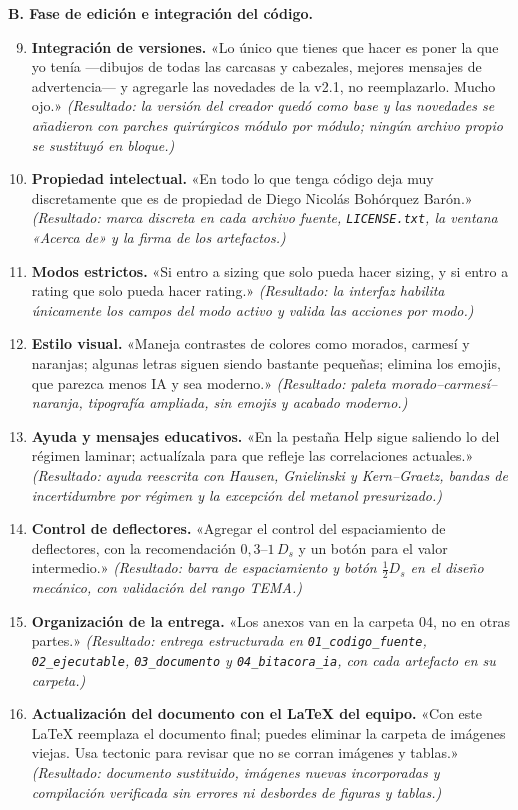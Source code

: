 \documentclass[11pt,a4paper]{article}
\begin{document}
\textbf{B. Fase de edición e integración del código.}
\begin{enumerate}\setcounter{enumi}{8}
\item \textbf{Integración de versiones.} «Lo único que tienes que hacer es
poner la que yo tenía ---dibujos de todas las carcasas y cabezales, mejores
mensajes de advertencia--- y agregarle las novedades de la v2.1, no
reemplazarlo. Mucho ojo.» \emph{(Resultado: la versión del creador quedó
como base y las novedades se añadieron con parches quirúrgicos módulo por
módulo; ningún archivo propio se sustituyó en bloque.)}
\item \textbf{Propiedad intelectual.} «En todo lo que tenga código deja
muy discretamente que es de propiedad de Diego Nicolás Bohórquez Barón.»
\emph{(Resultado: marca discreta en cada archivo fuente,
\texttt{LICENSE.txt}, la ventana «Acerca de» y la firma de los
artefactos.)}
\item \textbf{Modos estrictos.} «Si entro a sizing que solo pueda hacer
sizing, y si entro a rating que solo pueda hacer rating.»
\emph{(Resultado: la interfaz habilita únicamente los campos del modo
activo y valida las acciones por modo.)}
\item \textbf{Estilo visual.} «Maneja contrastes de colores como morados,
carmesí y naranjas; algunas letras siguen siendo bastante pequeñas; elimina
los emojis, que parezca menos IA y sea moderno.» \emph{(Resultado: paleta
morado--carmesí--naranja, tipografía ampliada, sin emojis y acabado
moderno.)}
\item \textbf{Ayuda y mensajes educativos.} «En la pestaña Help sigue
saliendo lo del régimen laminar; actualízala para que refleje las
correlaciones actuales.» \emph{(Resultado: ayuda reescrita con Hausen,
Gnielinski y Kern--Graetz, bandas de incertidumbre por régimen y la
excepción del metanol presurizado.)}
\item \textbf{Control de deflectores.} «Agregar el control del
espaciamiento de deflectores, con la recomendación $0{,}3$--$1\,D_s$ y un
botón para el valor intermedio.» \emph{(Resultado: barra de espaciamiento y
botón $\frac{1}{2}D_s$ en el diseño mecánico, con validación del rango
TEMA.)}
\item \textbf{Organización de la entrega.} «Los anexos van en la carpeta
04, no en otras partes.» \emph{(Resultado: entrega estructurada en
\texttt{01\_codigo\_fuente}, \texttt{02\_ejecutable},
\texttt{03\_documento} y \texttt{04\_bitacora\_ia}, con cada artefacto en
su carpeta.)}
\item \textbf{Actualización del documento con el LaTeX del equipo.} «Con
este LaTeX reemplaza el documento final; puedes eliminar la carpeta de
imágenes viejas. Usa tectonic para revisar que no se corran imágenes y
tablas.» \emph{(Resultado: documento sustituido, imágenes nuevas
incorporadas y compilación verificada sin errores ni desbordes de figuras y
tablas.)}
\end{enumerate}
\end{document}
